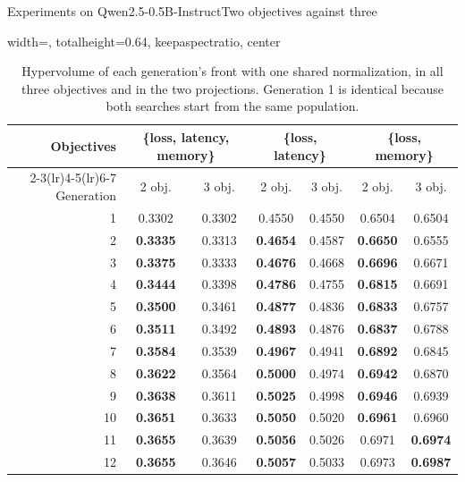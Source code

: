 \documentclass[aspectratio=169,10pt]{beamer}
\begin{document}
\begin{frame}{Experiments on Qwen2.5-0.5B-Instruct}{Two objectives against three}
\begin{table}
\centering
\begin{adjustbox}{width=\linewidth, totalheight=0.64\textheight, keepaspectratio, center}
\centering
\small
\begin{tabular}{rcccccc}
\toprule
Objectives & \multicolumn{2}{c}{\{loss, latency, memory\}} & \multicolumn{2}{c}{\{loss, latency\}} & \multicolumn{2}{c}{\{loss, memory\}} \\
\cmidrule(lr){2-3}\cmidrule(lr){4-5}\cmidrule(lr){6-7}
Generation & 2 obj. & 3 obj. & 2 obj. & 3 obj. & 2 obj. & 3 obj. \\
\midrule
1  & 0.3302          & 0.3302 & 0.4550          & 0.4550 & 0.6504          & 0.6504 \\
2  & \textbf{0.3335} & 0.3313 & \textbf{0.4654} & 0.4587 & \textbf{0.6650} & 0.6555 \\
3  & \textbf{0.3375} & 0.3333 & \textbf{0.4676} & 0.4668 & \textbf{0.6696} & 0.6671 \\
4  & \textbf{0.3444} & 0.3398 & \textbf{0.4786} & 0.4755 & \textbf{0.6815} & 0.6691 \\
5  & \textbf{0.3500} & 0.3461 & \textbf{0.4877} & 0.4836 & \textbf{0.6833} & 0.6757 \\
6  & \textbf{0.3511} & 0.3492 & \textbf{0.4893} & 0.4876 & \textbf{0.6837} & 0.6788 \\
7  & \textbf{0.3584} & 0.3539 & \textbf{0.4967} & 0.4941 & \textbf{0.6892} & 0.6845 \\
8  & \textbf{0.3622} & 0.3564 & \textbf{0.5000} & 0.4974 & \textbf{0.6942} & 0.6870 \\
9  & \textbf{0.3638} & 0.3611 & \textbf{0.5025} & 0.4998 & \textbf{0.6946} & 0.6939 \\
10 & \textbf{0.3651} & 0.3633 & \textbf{0.5050} & 0.5020 & \textbf{0.6961} & 0.6960 \\
11 & \textbf{0.3655} & 0.3639 & \textbf{0.5056} & 0.5026 & 0.6971          & \textbf{0.6974} \\
12 & \textbf{0.3655} & 0.3646 & \textbf{0.5057} & 0.5033 & 0.6973          & \textbf{0.6987} \\
\bottomrule
\end{tabular}
\end{adjustbox}
\caption{Hypervolume of each generation's front with one shared normalization, in all three objectives
and in the two projections. Generation 1 is identical because both searches start from the same
population.}\label{tab:hv}
\end{table}
\end{frame}
\end{document}
